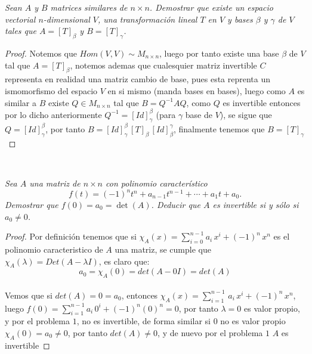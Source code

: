 \documentclass[11pt]{article}
\begin{document}
\begin{tcolorbox}[title = \textcolor{black}{\textcolor{white}{Problema 5}}]
\textit{
Sean \( A \) y \( B \) matrices similares de \( n \times n \). Demostrar que existe un espacio vectorial \( n \)-dimensional \( V \), una transformación lineal \( T \) en \( V \) y bases \( \beta \) y \( \gamma \) de \( V \) tales que \( A = [T]_\beta \) y \( B = [T]_\gamma \).
}
\end{tcolorbox}
\begin{proof}
    Notemos que $Hom(V,V)\sim M_{n\times n}$, luego por tanto existe una base $\beta$ de $V$ tal que $A=[T]_{\beta}$, notemos ademas que cualesquier 
    matriz invertible $C$ representa en realidad una matriz cambio de base, pues esta reprenta un ismomorfismo del espacio $V$ en si mismo (manda bases en bases), luego como $A$ es similar a $B$ existe $Q\in M_{n\times n}$
    tal que $B=Q^{-1}A Q$, como $Q$ es invertible entonces por lo dicho anteriormente $Q^{-1}=[Id]_{\gamma}^{\beta}$ (para $\gamma$ base de $V$), se sigue que $Q=[Id]_{\gamma}^{\beta}$, por tanto $B=[Id]_{\gamma}^{\beta}\,[T]_{\beta}\,[Id]_{\beta}^{\gamma}$, finalmente tenemos que $B=[T]_{\gamma}$
\end{proof}\,\\
\begin{tcolorbox}[title = \textcolor{black}{\textcolor{white}{Problema 6}}]
\textit{
Sea \( A \) una matriz de \( n \times n \) con polinomio característico
\[
f(t) = (-1)^n t^n + a_{n-1}t^{n-1} + \cdots + a_1 t + a_0.
\]
Demostrar que \( f(0) = a_0 = \det(A) \). Deducir que \( A \) es invertible si y sólo si \( a_0 \neq 0 \).
}
\end{tcolorbox}
\begin{proof}
   Por definici\'on tenemos que  si $\chi_{A}(x)=\sum_{i=0}^{n-1}a_i\,x^i+(-1)^n\,x^n$ es el polinomio caracteristico de $A$ una matriz, se cumple que $\chi_A(\lambda)=Det(A-\lambda I)$, es claro que:\,\\
   \begin{equation*}
    a_0=\chi_{A}(0)=det(A-0I)=det(A)
   \end{equation*}\,\\
   Vemos que si $det(A)=0=a_0$, entonces $\chi_{A}(x)=\sum_{i=1}^{n-1}\,a_i\,x^i+(-1)^n\,x^n$, luego $f(0)=\sum_{i=1}^{n-1}a_i\,0^i+(-1)^n(0)^{n}=0$, por tanto $\lambda=0$ es valor propio, y por el problema $1$, no es invertible, de forma similar si $0$ no es valor propio $\chi_{A}(0)=a_0\neq 0$, por tanto $det(A)\neq 0$, y de nuevo por el problema $1$
   $A$ es invertible
\end{proof}\,\\
\end{document}
